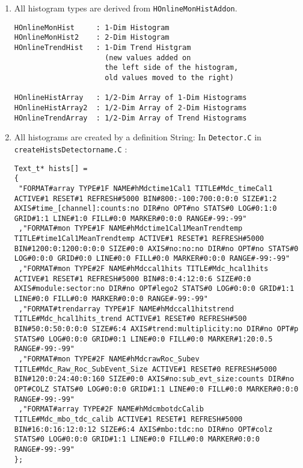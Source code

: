 \begin{enumerate}
  \item  All histogram types are derived from \verb+HOnlineMonHistAddon+.
\begin{lstlisting}         
HOnlineMonHist	   : 1-Dim Histogram
HOnlineMonHist2	   : 2-Dim Histogram
HOnlineTrendHist   : 1-Dim Trend Histgram
                     (new values added on
                     the left side of the histogram, 
                     old values moved to the right)
                
HOnlineHistArray   : 1/2-Dim Array of 1-Dim Histograms
HOnlineHistArray2  : 1/2-Dim Array of 2-Dim Histograms
HOnlineTrendArray  : 1/2-Dim Array of Trend Histograms
\end{lstlisting}         
       
  \item All histograms are created by a definition String:
In \verb+Detector.C+ in 
\newline
\verb+createHistsDetectorname.C+ :
                
\begin{lstlisting}         
Text_t* hists[] = 
{
 "FORMAT#array TYPE#1F NAME#hMdctime1Cal1 TITLE#Mdc_timeCal1 ACTIVE#1 RESET#1 REFRESH#5000 BIN#800:-100:700:0:0:0 SIZE#1:2 AXIS#time_[channel]:counts:no DIR#no OPT#no STATS#0 LOG#0:1:0 GRID#1:1 LINE#1:0 FILL#0:0 MARKER#0:0:0 RANGE#-99:-99"
 ,"FORMAT#mon TYPE#1F NAME#hMdctime1Cal1MeanTrendtemp TITLE#time1Cal1MeanTrendtemp ACTIVE#1 RESET#1 REFRESH#5000  BIN#1200:0:1200:0:0:0 SIZE#0:0 AXIS#no:no:no DIR#no OPT#no STATS#0 LOG#0:0:0 GRID#0:0 LINE#0:0 FILL#0:0 MARKER#0:0:0 RANGE#-99:-99"
 ,"FORMAT#mon TYPE#2F NAME#hMdccal1hits TITLE#Mdc_hcal1hits ACTIVE#1 RESET#1 REFRESH#5000 BIN#8:0:4:12:0:6 SIZE#0:0 AXIS#module:sector:no DIR#no OPT#lego2 STATS#0 LOG#0:0:0 GRID#1:1 LINE#0:0 FILL#0:0 MARKER#0:0:0 RANGE#-99:-99"
 ,"FORMAT#trendarray TYPE#1F NAME#hMdccal1hitstrend TITLE#Mdc_hcal1hits_trend ACTIVE#1 RESET#0 REFRESH#500 BIN#50:0:50:0:0:0 SIZE#6:4 AXIS#trend:multiplicity:no DIR#no OPT#p STATS#0 LOG#0:0:0 GRID#0:1 LINE#0:0 FILL#0:0 MARKER#1:20:0.5 RANGE#-99:-99"
 ,"FORMAT#mon TYPE#2F NAME#hMdcrawRoc_Subev TITLE#Mdc_Raw_Roc_SubEvent_Size ACTIVE#1 RESET#0 REFRESH#5000 BIN#120:0:24:40:0:160 SIZE#0:0 AXIS#no:sub_evt_size:counts DIR#no OPT#COLZ STATS#0 LOG#0:0:0 GRID#1:1 LINE#0:0 FILL#0:0 MARKER#0:0:0 RANGE#-99:-99"
 ,"FORMAT#array TYPE#2F NAME#hMdcmbotdcCalib TITLE#Mdc_mbo_tdc_calib ACTIVE#1 RESET#1 REFRESH#5000 BIN#16:0:16:12:0:12 SIZE#6:4 AXIS#mbo:tdc:no DIR#no OPT#colz STATS#0 LOG#0:0:0 GRID#1:1 LINE#0:0 FILL#0:0 MARKER#0:0:0 RANGE#-99:-99"
};
\end{lstlisting}         


\end{enumerate}
